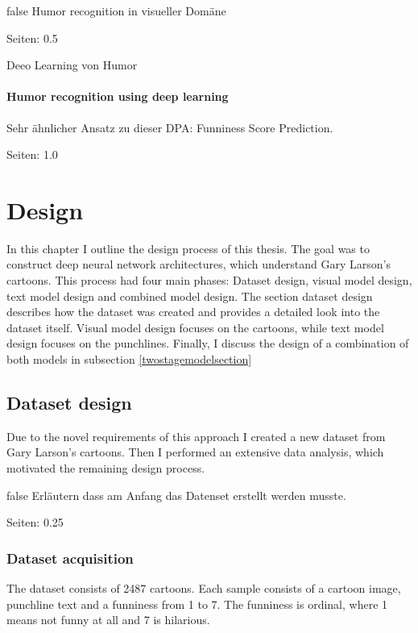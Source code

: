 \documentclass[draft,final,oneside]{vutinfth} %
\begin{document}
\if false
Humor recognition in visueller Domäne

\cite{chen2017convolutional}

Seiten: 0.5


Deeo Learning von Humor 

\cite{chen2018humor}



\subsubsection{Humor recognition using deep learning}

Sehr ähnlicher Ansatz zu dieser DPA: Funniness Score Prediction.

\cite{chiruzzo2019overview}

Seiten: 1.0
\fi

\chapter{Design} \label{design}

In this chapter I outline the design process of this thesis. The goal was to construct deep neural network architectures, which understand Gary Larson's cartoons. This process had four main phases: Dataset design, visual model design, text model design and combined model design. The section dataset design describes how the dataset was created and provides a detailed look into the dataset itself. Visual model design focuses on the cartoons, while text model design focuses on the punchlines. Finally, I discuss the design of a combination of both models in subsection \ref{twostagemodelsection}

\section{Dataset design}

Due to the novel requirements of this approach I created a new dataset from Gary Larson's cartoons. Then I performed an extensive data analysis, which motivated the remaining design process.

\if false
Erläutern dass am Anfang das Datenset erstellt werden musste.

Seiten: 0.25
\fi

\subsection{Dataset acquisition}
The dataset consists of 2487 cartoons. Each sample consists of a cartoon image, punchline text and a funniness from 1 to 7. The funniness is ordinal, where 1 means not funny at all and 7 is hilarious.
\end{document}
